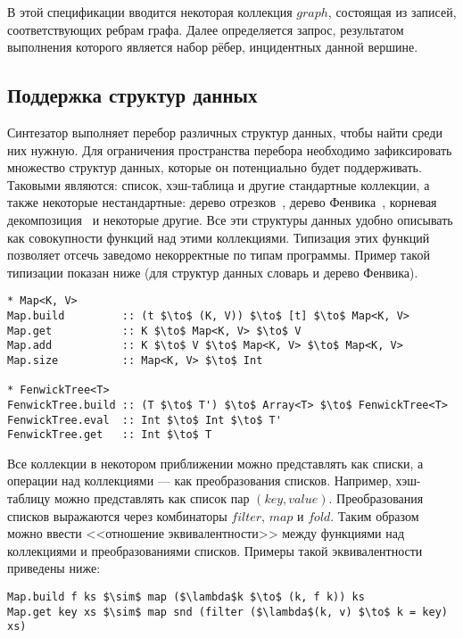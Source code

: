 \documentclass[14pt]{matmex-diploma-custom}
\begin{document}
В этой спецификации вводится некоторая коллекция $graph$, состоящая из записей, соответствующих ребрам графа. Далее определяется запрос, результатом выполнения которого является набор рёбер, инцидентных данной вершине.


\subsection{Поддержка структур данных}
Синтезатор выполняет перебор различных структур данных, чтобы найти среди них нужную. Для ограничения пространства перебора необходимо зафиксировать множество структур данных, которые он потенциально будет поддерживать. Таковыми являются: список, хэш-таблица и другие стандартные коллекции, а также некоторые нестандартные: дерево отрезков~\cite{Bentley1977}, дерево Фенвика~\cite{Fenwick}, корневая декомпозиция~\cite{RootDec} и некоторые другие. Все эти структуры данных удобно описывать как совокупности функций над этими коллекциями. Типизация этих функций позволяет отсечь заведомо некорректные по типам программы. Пример такой типизации показан ниже (для структур данных словарь и дерево Фенвика).

\begin{lstlisting}[language=CollectionLang, mathescape=true]
* Map<K, V>
Map.build         :: (t $\to$ (K, V)) $\to$ [t] $\to$ Map<K, V>
Map.get           :: K $\to$ Map<K, V> $\to$ V
Map.add           :: K $\to$ V $\to$ Map<K, V> $\to$ Map<K, V>
Map.size          :: Map<K, V> $\to$ Int

* FenwickTree<T>
FenwickTree.build :: (T $\to$ T') $\to$ Array<T> $\to$ FenwickTree<T> 
FenwickTree.eval  :: Int $\to$ Int $\to$ T'
FenwickTree.get   :: Int $\to$ T
\end{lstlisting}

Все коллекции в некотором приближении можно представлять как списки, а операции над коллекциями --- как преобразования списков. Например, хэш-таблицу можно представлять как список пар $(key, value)$. Преобразования списков выражаются через комбинаторы $filter$, $map$ и $fold$. Таким образом можно ввести <<отношение эквивалентности>> между функциями над коллекциями и преобразованиями списков. Примеры такой эквивалентности приведены ниже:
\begin{lstlisting}[language=CollectionLang, mathescape=true]
Map.build f ks $\sim$ map ($\lambda$k $\to$ (k, f k)) ks
Map.get key xs $\sim$ map snd (filter ($\lambda$(k, v) $\to$ k = key) xs)
\end{lstlisting}
\end{document}
